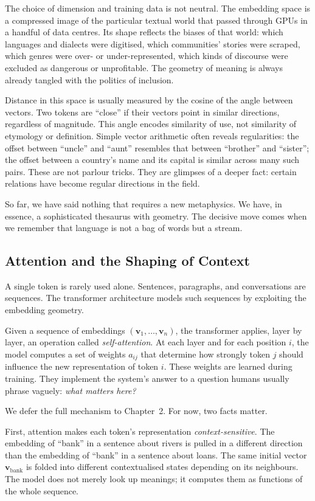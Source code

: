 \documentclass[12pt,a4paper]{report}
\begin{document}
The choice of dimension and training data is not neutral. The embedding space is a compressed image of the particular textual world that passed through GPUs in a handful of data centres. Its shape reflects the biases of that world: which languages and dialects were digitised, which communities' stories were scraped, which genres were over- or under-represented, which kinds of discourse were excluded as dangerous or unprofitable. The geometry of meaning is always already tangled with the politics of inclusion.

Distance in this space is usually measured by the cosine of the angle between vectors. Two tokens are ``close'' if their vectors point in similar directions, regardless of magnitude. This angle encodes similarity of use, not similarity of etymology or definition. Simple vector arithmetic often reveals regularities: the offset between ``uncle'' and ``aunt'' resembles that between ``brother'' and ``sister''; the offset between a country's name and its capital is similar across many such pairs. These are not parlour tricks. They are glimpses of a deeper fact: certain relations have become regular directions in the field.

So far, we have said nothing that requires a new metaphysics. We have, in essence, a sophisticated thesaurus with geometry. The decisive move comes when we remember that language is not a bag of words but a stream.

\subsection*{Attention and the Shaping of Context}

A single token is rarely used alone. Sentences, paragraphs, and conversations are sequences. The transformer architecture models such sequences by exploiting the embedding geometry.

Given a sequence of embeddings $(\mathbf{v}_1, \ldots, \mathbf{v}_n)$, the transformer applies, layer by layer, an operation called \emph{self-attention}. At each layer and for each position $i$, the model computes a set of weights $a_{ij}$ that determine how strongly token $j$ should influence the new representation of token $i$. These weights are learned during training. They implement the system's answer to a question humans usually phrase vaguely: \emph{what matters here?}

We defer the full mechanism to Chapter~2. For now, two facts matter.

First, attention makes each token's representation \emph{context-sensitive}. The embedding of ``bank'' in a sentence about rivers is pulled in a different direction than the embedding of ``bank'' in a sentence about loans. The same initial vector $\mathbf{v}_{\text{bank}}$ is folded into different contextualised states depending on its neighbours. The model does not merely look up meanings; it computes them as functions of the whole sequence.
\end{document}
